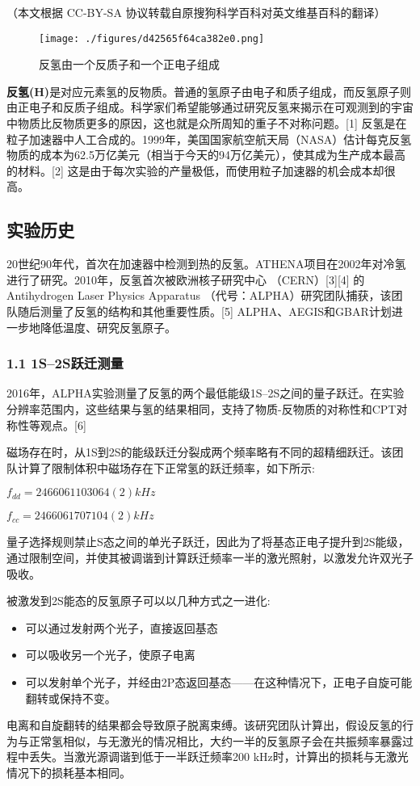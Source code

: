 
（本文根据 CC-BY-SA 协议转载自原搜狗科学百科对英文维基百科的翻译）

\begin{figure}[ht]
\centering
\texttt{[image: ./figures/d42565f64ca382e0.png]}
\caption{反氢由一个反质子和一个正电子组成} \label{fig_FQYZ_2}
\end{figure}
\textbf{反氢(H)}是对应元素氢的反物质。普通的氢原子由电子和质子组成，而反氢原子则由正电子和反质子组成。科学家们希望能够通过研究反氢来揭示在可观测到的宇宙中物质比反物质更多的原因，这也就是众所周知的重子不对称问题。[1] 反氢是在粒子加速器中人工合成的。1999年，美国国家航空航天局（NASA）估计每克反氢物质的成本为62.5万亿美元（相当于今天的94万亿美元），使其成为生产成本最高的材料。[2] 这是由于每次实验的产量极低，而使用粒子加速器的机会成本却很高。

\subsection{实验历史}
20世纪90年代，首次在加速器中检测到热的反氢。ATHENA项目在2002年对冷氢进行了研究。2010年，反氢首次被欧洲核子研究中心 （CERN）[3][4] 的Antihydrogen Laser Physics Apparatus （代号：ALPHA）研究团队捕获，该团队随后测量了反氢的结构和其他重要性质。[5] ALPHA、AEGIS和GBAR计划进一步地降低温度、研究反氢原子。
\subsubsection{1.1 1S–2S跃迁测量}
2016年，ALPHA实验测量了反氢的两个最低能级1S–2S之间的量子跃迁。在实验分辨率范围内，这些结果与氢的结果相同，支持了物质-反物质的对称性和CPT对称性等观点。[6]

磁场存在时，从1S到2S的能级跃迁分裂成两个频率略有不同的超精细跃迁。该团队计算了限制体积中磁场存在下正常氢的跃迁频率，如下所示:

$f_{dd} =2 466 061 103 064 (2) kHz$

$f_{cc} =2 466 061 707 104 (2) kHz$

量子选择规则禁止S态之间的单光子跃迁，因此为了将基态正电子提升到2S能级，通过限制空间，并使其被调谐到计算跃迁频率一半的激光照射，以激发允许双光子吸收。

被激发到2S能态的反氢原子可以以几种方式之一进化:
\begin{itemize}
\item 可以通过发射两个光子，直接返回基态
\item 可以吸收另一个光子，使原子电离
\item 可以发射单个光子，并经由2P态返回基态——在这种情况下，正电子自旋可能翻转或保持不变。
\end{itemize}
电离和自旋翻转的结果都会导致原子脱离束缚。该研究团队计算出，假设反氢的行为与正常氢相似，与无激光的情况相比，大约一半的反氢原子会在共振频率暴露过程中丢失。当激光源调谐到低于一半跃迁频率200 kHz时，计算出的损耗与无激光情况下的损耗基本相同。

